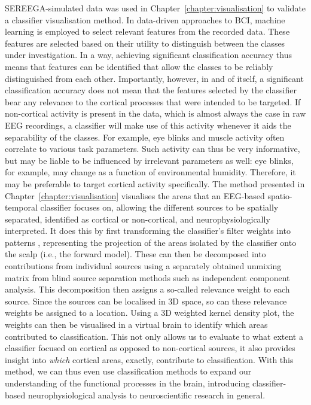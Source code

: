 SEREEGA-simulated data was used in Chapter~\ref{chapter:visualisation} to validate a classifier visualisation method. In data-driven approaches to BCI, machine learning is employed to select relevant features from the recorded data. These features are selected based on their utility to distinguish between the classes under investigation. In a way, achieving significant classification accuracy thus means that features can be identified that allow the classes to be reliably distinguished from each other. Importantly, however, in and of itself, a significant classification accuracy does not mean that the features selected by the classifier bear any relevance to the cortical processes that were intended to be targeted. If non-cortical activity is present in the data, which is almost always the case in raw EEG recordings, a classifier will make use of this activity whenever it aids the separability of the classes. For example, eye blinks and muscle activity often correlate to various task parameters. Such activity can thus be very informative, but may be liable to be influenced by irrelevant parameters as well: eye blinks, for example, may change as a function of environmental humidity. Therefore, it may be preferable to target cortical activity specifically. The method presented in Chapter~\ref{chapter:visualisation} visualises the areas that an EEG-based spatio-temporal classifier focuses on, allowing the different sources to be spatially separated, identified as cortical or non-cortical, and neurophysiologically interpreted. It does this by first transforming the classifier's filter weights into patterns \cite{haufe2014}, representing the projection of the areas isolated by the classifier onto the scalp (i.e., the forward model). These can then be decomposed into contributions from individual sources using a separately obtained unmixing matrix from blind source separation methods such as independent component analysis. This decomposition then assigns a so-called relevance weight to each source. Since the sources can be localised in 3D space, so can these relevance weights be assigned to a location. Using a 3D weighted kernel density plot, the weights can then be visualised in a virtual brain to identify which areas contributed to classification. This not only allows us to evaluate to what extent a classifier focused on cortical as opposed to non-cortical sources, it also provides insight into \emph{which} cortical areas, exactly, contribute to classification. With this method, we can thus even use classification methods to expand our understanding of the functional processes in the brain, introducing classifier-based neurophysiological analysis to neuroscientific research in general.

